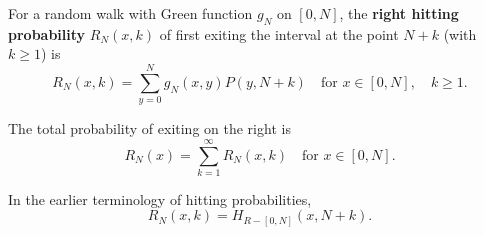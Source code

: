 For a random walk with Green function $g_N$ on $[0,N]$, the \textbf{right hitting probability} $R_N(x,k)$ of first exiting the interval at the point $N+k$ (with $k \geq 1$) is
$$R_N(x,k) = \sum_{y=0}^{N} g_N(x,y) P(y, N+k) \quad \text{for } x \in [0,N], \quad k \geq 1.$$

The total probability of exiting on the right is
$$R_N(x) = \sum_{k=1}^{\infty} R_N(x,k) \quad \text{for } x \in [0,N].$$

In the earlier terminology of hitting probabilities,
$$R_N(x,k) = H_{R-[0,N]}(x, N+k).$$
